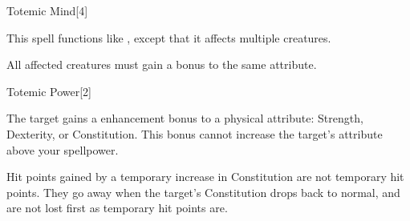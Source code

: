 \begin{spellsection}[Mass]{Totemic Mind}[4]
    \begin{spellheader}
    \end{spellheader}
    \begin{spellcontent}
        \begin{spelltargetinginfo}
        \end{spelltargetinginfo}
        \begin{spelleffects}
            \spellspecial This spell functions like , except that it affects multiple creatures.
            \spelldur \durshort
        \end{spelleffects}
    \end{spellcontent}
    \begin{spellfooter}
        \spellnotes All affected creatures must gain a bonus to the same attribute.
    \end{spellfooter}
\end{spellsection}

\begin{spellsection}{Totemic Power}[2]
    \begin{spellheader}
    \end{spellheader}
    \begin{spellcontent}
        \begin{spelltargetinginfo}
        \end{spelltargetinginfo}
        \begin{spelleffects}
            \spelleffect The target gains a  enhancement bonus to a physical attribute: Strength, Dexterity, or Constitution. This bonus cannot increase the target's attribute above your spellpower.
            \spelldur \durpersonallong
        \end{spelleffects}
    \end{spellcontent}
    \begin{spellfooter}
        \spellnotes Hit points gained by a temporary increase in Constitution are not temporary hit points. They go away when the target's Constitution drops back to normal, and are not lost first as temporary hit points are.
    \end{spellfooter}
\end{spellsection}


